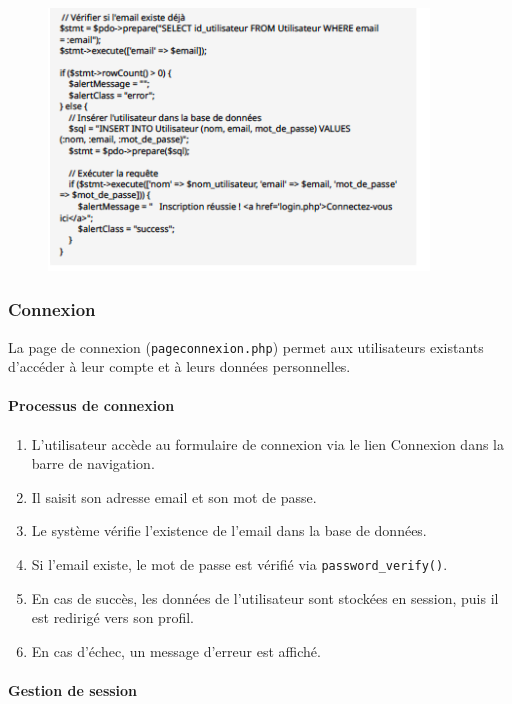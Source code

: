 \documentclass[a4paper,12pt]{article}
\begin{document}
\begin{figure}[H]
  \centering
  \includegraphics[width=0.9\textwidth]{capture3.png}
\end{figure}
\subsubsection{Connexion}

La page de connexion (\texttt{pageconnexion.php}) permet aux utilisateurs existants d'accéder à leur compte et à leurs données personnelles.

\paragraph{Processus de connexion}

\begin{enumerate}
  \item L'utilisateur accède au formulaire de connexion via le lien \og Connexion \fg{} dans la barre de navigation.
  \item Il saisit son adresse email et son mot de passe.
  \item Le système vérifie l'existence de l'email dans la base de données.
  \item Si l'email existe, le mot de passe est vérifié via \texttt{password\_verify()}.
  \item En cas de succès, les données de l’utilisateur sont stockées en session, puis il est redirigé vers son profil.
  \item En cas d’échec, un message d’erreur est affiché.
\end{enumerate}

\paragraph{Gestion de session}
\end{document}
